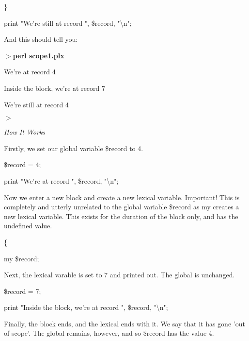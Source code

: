 \documentclass[a4paper,11pt]{book}
\begin{document}
\noindent \}

\noindent 

\noindent print "We're still at record ", \$record, "\textbackslash n";

\noindent 

\noindent And this should tell you:

\noindent 

\noindent $>$\textbf{perl scope1.plx}

\noindent We're at record 4

\noindent Inside the block, we're at record 7

\noindent We're still at record 4

\noindent $>$

\noindent 

\noindent 

\noindent \textit{How It Works}

\noindent Firstly, we set our global variable \$record to 4.

\noindent 

\noindent 

\noindent \$record = 4;

\noindent print "We're at record ", \$record, "\textbackslash n";

\noindent 

\noindent Now we enter a new block and create a new lexical variable. Important! This is completely and utterly unrelated to the global variable \$record as my creates a new lexical variable. This exists for the duration of the block only, and has the undefined value.

\noindent 

\noindent 

\noindent \{

\noindent my \$record;

\noindent 

\noindent Next, the lexical varable is set to 7 and printed out. The global is unchanged.

\noindent 

\noindent 

\noindent \$record = 7;

\noindent print "Inside the block, we're at record ", \$record, "\textbackslash n";

\noindent 

\noindent Finally, the block ends, and the lexical ends with it. We say that it has gone 'out of scope'. The global remains, however, and so \$record has the value 4.
\end{document}
